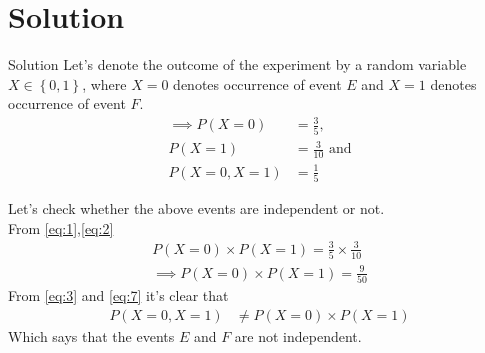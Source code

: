 \documentclass{beamer}
\providecommand{\cbrak}[1]{\ensuremath{\left\{#1\right\}}}
\begin{document}
\section{Solution}
\begin{frame}{Solution}
Let's denote the outcome of the experiment by a random variable $X\in \cbrak{0, 1}$, where $X = 0$ denotes occurrence of event $E$ and $X = 1$ denotes occurrence of event $F$.
\begin{align}
    \implies P(X=0)&=\frac{3}{5},\label{eq:1}\\
    P(X=1)&=\frac{3}{10}\label{eq:2} \text{ and}\\
    P(X=0,X=1)&=\frac{1}{5}\label{eq:3}
\end{align}
\end{frame}
\begin{frame}{}
Let's check whether the above events are independent or not.\\
From \eqref{eq:1},\eqref{eq:2}
\begin{align}
    P(X=0)\times P(X=1)=\frac{3}{5} \times \frac{3}{10}\\
    \implies P(X=0)\times P(X=1)=\frac{9}{50}\label{eq:7}
\end{align}
From \eqref{eq:3} and \eqref{eq:7} it's clear that
\begin{align}
    P(X=0,X=1)&\neq P(X=0)\times P(X=1)
\end{align}
Which says that the events $ E$ and $F$ are not independent.

\end{frame} 
\end{document}
